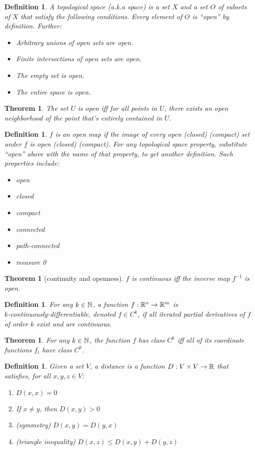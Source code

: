 \documentclass[11pt]{amsbook}
\theoremstyle{mystyle} \newtheorem{thrm}[thm]{Theorem}
\theoremstyle{mystyle} \newtheorem{defi}[thm]{Definition}
\theoremstyle{mystyle} \newtheorem{coro}[thm]{Corollary}
\theoremstyle{mystyle} \newtheorem{propo}[thm]{Proposition}
\theoremstyle{mystyle} \newtheorem{lemm}[thm]{Lemma}
\numberwithin{thm}{section}
\newcommand{\de}{\emph}
\begin{document}
\begin{defi}
	A \de{topological space} (a.k.a \de{space}) is a set $X$ and a set $O$ of subsets of $X$ that satisfy the following conditions.  Every element of $O$ is ``open'' by definition.  Further:
	\begin{itemize}
		\item Arbitrary unions of open sets are open.
		\item Finite intersections of open sets are open.
		\item The empty set is open.
		\item The entire space is open.
	\end{itemize}
\end{defi}
\begin{thrm}
	The set $U$ is open iff for all points in $U$, there exists an open neighborhood of the point that's entirely contained in $U$.
\end{thrm}
\begin{defi}
	$f$ is an \de{open} map if the image of every open (closed) (compact) set under $f$ is open (closed) (compact).
	For any topological space property, substitute ``open'' above with the name of that property, to get another definition.  Such properties include:
	\begin{itemize}
		\item open
		\item closed
		\item compact
		\item connected
		\item path-connected
		\item measure 0
	\end{itemize}
\end{defi}
\begin{thrm}[continuity and openness]
	$f$ is continuous iff the inverse map $f^{-1}$ is open.
\end{thrm}
\begin{defi}
	For any $k \in {\mathbb N}$, a function $f:{\mathbb R}^n \to {\mathbb R}^m$ is \\\de{$k$-continuously-differentiable}, denoted $f \in C^k$, if all iterated partial derivatives of $f$ of order $k$ exist and are continuous.
\end{defi}
\begin{thrm}
	For any $k \in {\mathbb N}$, the function $f$ has class $C^k$ iff all of its coordinate functions $f_i$ have class $C^k$.
\end{thrm}
\begin{defi}
	Given a set $V$, a \de{distance} is a function $D : V \times V \to {\mathbb R}$ that satisfies, for all $x, y, z \in V$:
	\begin{enumerate}
		\item $D(x,x) = 0$
		\item If $x \neq y$, then $D(x,y) > 0$
		\item (symmetry) $D(x,y) = D(y,x)$
		\item (triangle inequality) $D(x,z) \leq D(x,y) + D(y,z)$
	\end{enumerate}
\end{defi}
\end{document}
